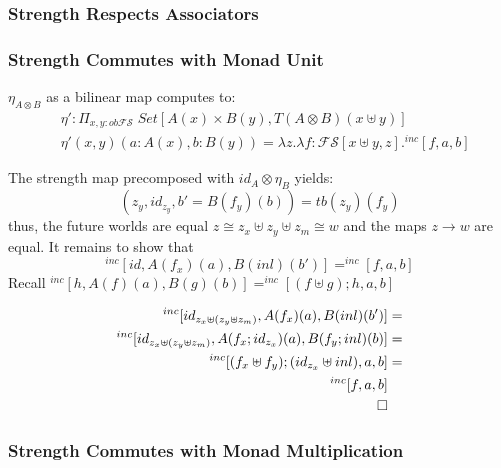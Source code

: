 \documentclass{article}
\begin{document}
\subsubsection{Strength Respects Associators}
\subsubsection{Strength Commutes with Monad Unit}
\begin{figure}[!ht]
    \centering
\end{figure}
$\eta_{A\otimes B}$ as a bilinear map computes to:
\begin{align*}
    & \eta' : \Pi_{x,y :ob \mathcal{FS}}\; Set[A(x)\times B(y) , T(A\otimes B)(x \uplus y)] \\
    & \eta' (x , y)(a : A(x), b :B(y)) = \lambda z . \lambda f: \mathcal{FS}[x \uplus y , z].^{inc}[f , a , b]
\end{align*}

The strength map precomposed with $id_A \otimes \eta_B$ yields:
\[
    (z_y , id_{z_y}, b' = B(f_y)(b)) = tb(z_y)(f_y)  
\]
thus, the future worlds are equal $z \cong z_x \uplus z_y \uplus z_m \cong w$ and the maps $z\rightarrow w$ are equal.
It remains to show that
\[
    ^{inc}[id, A(f_x)(a), B(inl)(b')] = ^{inc}[f , a , b]
\]
Recall $ ^{inc}[h , A(f)(a), B(g)(b)] = ^{inc}[(f \uplus g) ; h , a , b]  $

\begin{align*}
    ^{inc}[id_{z_x \uplus (z_y \uplus z_m)}, A(f_x)(a), B(inl)(b')] &= \\
    ^{inc}[id_{z_x \uplus (z_y \uplus z_m)}, A(f_x; id_{z_x})(a), B(f_y ; inl)(b)]  &= \\
    ^{inc}[(f_x \uplus f_y) ; (id_{z_x} \uplus inl), a , b] &= \\
    ^{inc}[f , a , b]\\
    \qed
\end{align*}
\subsubsection{Strength Commutes with Monad Multiplication}
\end{document}
